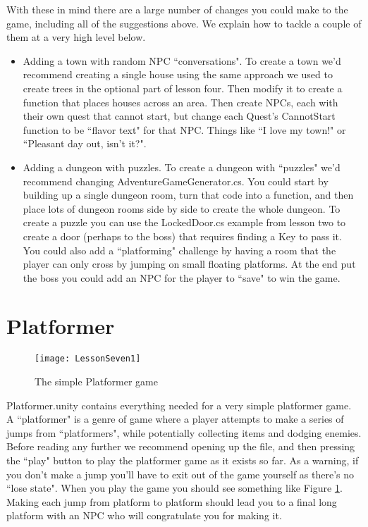 \documentclass{article}
\begin{document}
With these in mind there are a large number of changes you could make to the game, including all of the suggestions above. We explain how to tackle a couple of them at a very high level below. 

\begin{itemize}
  \item Adding a town with random NPC ``conversations". To create a town we'd recommend creating a single house using the same approach we used to create trees in the optional part of lesson four. Then modify it to create a function that places houses across an area. Then create NPCs, each with their own quest that cannot start, but change each Quest's CannotStart function to be ``flavor text" for that NPC. Things like ``I love my town!" or ``Pleasant day out, isn't it?". 
  \item Adding a dungeon with puzzles. To create a dungeon with ``puzzles" we'd recommend changing AdventureGameGenerator.cs. You could start by building up a single dungeon room, turn that code into a function, and then place lots of dungeon rooms side by side to create the whole dungeon. To create a puzzle you can use the LockedDoor.cs example from lesson two to create a door (perhaps to the boss) that requires finding a Key to pass it. You could also add a ``platforming" challenge by having a room that the player can only cross by jumping on small floating platforms. At the end put the boss you could add an NPC for the player to ``save" to win the game.
\end{itemize}

\section{Platformer}

 \begin{figure}
  \texttt{[image: LessonSeven1]}
  \caption{The simple Platformer game}
  \label{fig:platformer}
\end{figure}

Platformer.unity contains everything needed for a very simple platformer game. A ``platformer" is a genre of game where a player attempts to make a series of jumps from ``platformers", while potentially collecting items and dodging enemies.  Before reading any further we recommend opening up the file, and then pressing the ``play" button to play the platformer game as it exists so far. As a warning, if you don't make a jump you'll have to exit out of the game yourself as there's no ``lose state". When you play the game you should see something like Figure \ref{fig:platformer}. Making each jump from platform to platform should lead you to a final long platform with an NPC who will congratulate you for making it. 
\end{document}
